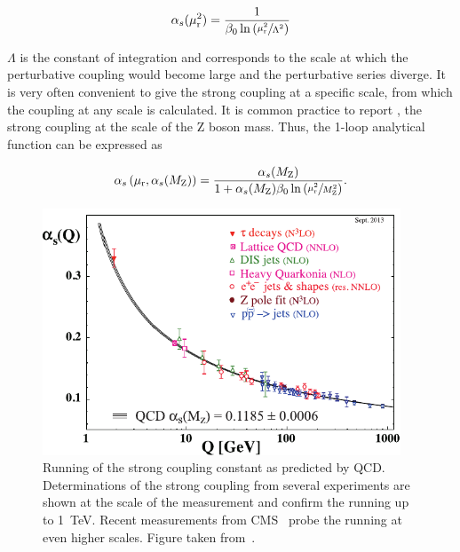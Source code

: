 \begin{equation*}
   \alpha_{s}(\mu_{\mathrm{r}}^2) = \frac{1}{\beta_0 \ln \left( \sfrac{\mu_{\mathrm{r}}^2}{\Lambda^2} \right)}
\end{equation*}

$\Lambda$ is the constant of integration and corresponds to the scale at which
the perturbative coupling would become large and the perturbative series
diverge. It is very often convenient to give the strong coupling at a specific
scale, from which the coupling at any scale is calculated. It is common practice
to report \asmz, the strong coupling at the scale of the Z boson mass. Thus, the
1-loop analytical function can be expressed as

\begin{equation*}
   \alpha_{s}\left(\mu_{\mathrm{r}}, \alpha_{s}(M_\mathrm{Z})\right) = \frac{\alpha_{s}(M_\mathrm{Z})}{1 + \alpha_{s}(M_\mathrm{Z})\beta_0 \ln
       \left( \sfrac{\mu_{\mathrm{r}}^2}{M_\mathrm{Z}^2} \right)}.
\end{equation*}

\begin{figure}[htbp] 
    \centering
    \includegraphics[width=0.95\textwidth]{figures/theoretical_foundations/as_running.pdf}\hfill
    \caption[Running of the strong coupling]{Running of the strong coupling
        constant as predicted by QCD. Determinations of the strong coupling from
        several experiments are shown at the scale of the measurement and
        confirm the running up to \SI{1}{\TeV}. Recent measurements from
        CMS~\cite{Khachatryan:2014waa,CMS:2014mna} probe the running at even
        higher scales. Figure taken from~\cite{Agashe:2014kda}.} 
    \label{fig:as_running} 
\end{figure}


